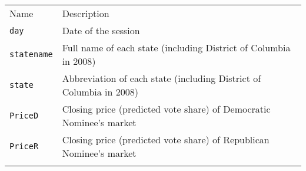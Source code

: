 \documentclass[]{article}
\begin{document}
\begin{longtable}[c]{@{}ll@{}}
\toprule\addlinespace
\begin{minipage}[b]{0.24\columnwidth}\raggedright
Name
\end{minipage} & \begin{minipage}[b]{0.69\columnwidth}\raggedright
Description
\end{minipage}
\\\addlinespace
\midrule\endhead
\begin{minipage}[t]{0.24\columnwidth}\raggedright
\texttt{day}
\end{minipage} & \begin{minipage}[t]{0.69\columnwidth}\raggedright
Date of the session
\end{minipage}
\\\addlinespace
\begin{minipage}[t]{0.24\columnwidth}\raggedright
\texttt{statename}
\end{minipage} & \begin{minipage}[t]{0.69\columnwidth}\raggedright
Full name of each state (including District of Columbia in 2008)
\end{minipage}
\\\addlinespace
\begin{minipage}[t]{0.24\columnwidth}\raggedright
\texttt{state}
\end{minipage} & \begin{minipage}[t]{0.69\columnwidth}\raggedright
Abbreviation of each state (including District of Columbia in 2008)
\end{minipage}
\\\addlinespace
\begin{minipage}[t]{0.24\columnwidth}\raggedright
\texttt{PriceD}
\end{minipage} & \begin{minipage}[t]{0.69\columnwidth}\raggedright
Closing price (predicted vote share) of Democratic Nominee's market
\end{minipage}
\\\addlinespace
\begin{minipage}[t]{0.24\columnwidth}\raggedright
\texttt{PriceR}
\end{minipage} & \begin{minipage}[t]{0.69\columnwidth}\raggedright
Closing price (predicted vote share) of Republican Nominee's market
\end{minipage}
\\\addlinespace
\begin{minipage}[t]{0.24\columnwidth}\raggedright

\end{minipage}
\end{longtable}
\end{document}
